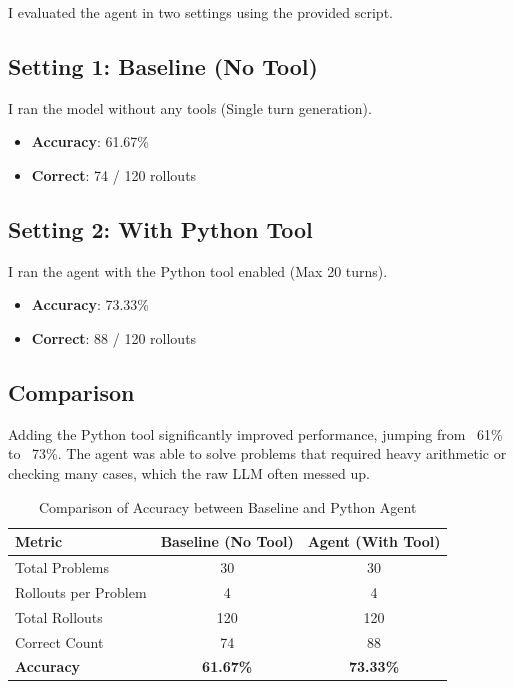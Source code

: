 \documentclass{article}
\begin{document}
I evaluated the agent in two settings using the provided script. 

\subsection{Setting 1: Baseline (No Tool)}
I ran the model without any tools (Single turn generation).
\begin{itemize}
    \item \textbf{Accuracy}: 61.67\%
    \item \textbf{Correct}: 74 / 120 rollouts
\end{itemize}

\subsection{Setting 2: With Python Tool}
I ran the agent with the Python tool enabled (Max 20 turns).
\begin{itemize}
    \item \textbf{Accuracy}: 73.33\%
    \item \textbf{Correct}: 88 / 120 rollouts
\end{itemize}

\subsection{Comparison}

Adding the Python tool significantly improved performance, jumping from ~61\% to ~73\%. The agent was able to solve problems that required heavy arithmetic or checking many cases, which the raw LLM often messed up.

\begin{table}[h]
    \centering
    \begin{tabular}{lcc}
        \toprule
        \textbf{Metric} & \textbf{Baseline (No Tool)} & \textbf{Agent (With Tool)} \\
        \midrule
        Total Problems & 30 & 30 \\
        Rollouts per Problem & 4 & 4 \\
        Total Rollouts & 120 & 120 \\
        Correct Count & 74 & 88 \\
        \textbf{Accuracy} & \textbf{61.67\%} & \textbf{73.33\%} \\
        \bottomrule
    \end{tabular}
    \caption{Comparison of Accuracy between Baseline and Python Agent}
    \label{tab:results}
\end{table}
\end{document}
